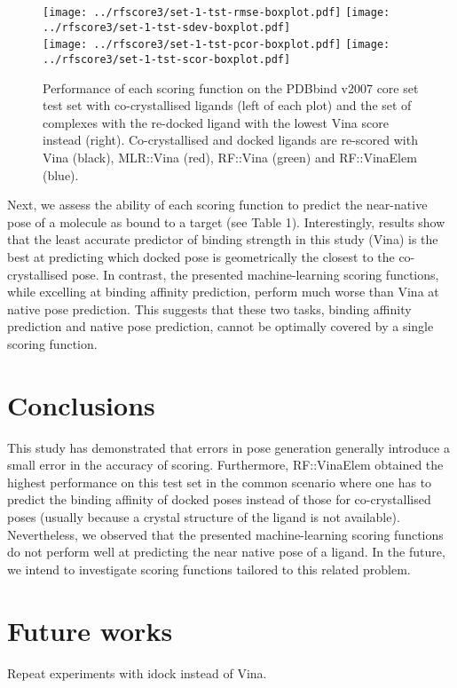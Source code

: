 \begin{figure}
\centering
\subfloat
{
  \texttt{[image: ../rfscore3/set-1-tst-rmse-boxplot.pdf]}
}
\subfloat
{
  \texttt{[image: ../rfscore3/set-1-tst-sdev-boxplot.pdf]}
}
\\
\subfloat
{
  \texttt{[image: ../rfscore3/set-1-tst-pcor-boxplot.pdf]}
}
\subfloat
{
  \texttt{[image: ../rfscore3/set-1-tst-scor-boxplot.pdf]}
}
\caption{Performance of each scoring function on the PDBbind v2007 core set test set with co-crystallised ligands (left of each plot) and the set of complexes with the re-docked ligand with the lowest Vina score instead (right). Co-crystallised and docked ligands are re-scored with Vina (black), MLR::Vina (red), RF::Vina (green) and RF::VinaElem (blue).}
\label{rfscore4:set-1-tst-stat-boxplot}
\end{figure}

Next, we assess the ability of each scoring function to predict the near-native pose of a molecule as bound to a target (see Table 1). Interestingly, results show that the least accurate predictor of binding strength in this study (Vina) is the best at predicting which docked pose is geometrically the closest to the co-crystallised pose. In contrast, the presented machine-learning scoring functions, while excelling at binding affinity prediction, perform much worse than Vina at native pose prediction. This suggests that these two tasks, binding affinity prediction and native pose prediction, cannot be optimally covered by a single scoring function.

\section{Conclusions}

This study has demonstrated that errors in pose generation generally introduce a small error in the accuracy of scoring. Furthermore, RF::VinaElem obtained the highest performance on this test set in the common scenario where one has to predict the binding affinity of docked poses instead of those for co-crystallised poses (usually because a crystal structure of the ligand is not available). Nevertheless, we observed that the presented machine-learning scoring functions do not perform well at predicting the near native pose of a ligand. In the future, we intend to investigate scoring functions tailored to this related problem.

\section{Future works}

Repeat experiments with idock instead of Vina.

\chapterend
